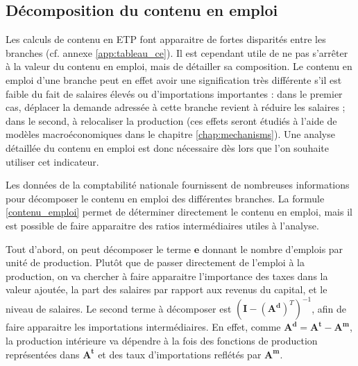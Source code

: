 \subsection{Décomposition du contenu en emploi}

Les calculs de contenu en ETP font apparaitre de fortes disparités entre les branches (cf. annexe \ref{app:tableau_ce}). Il est cependant utile de ne pas s’arrêter à la valeur du contenu en emploi, mais de détailler sa composition. Le contenu en emploi d’une branche peut en effet avoir une signification très différente s’il est faible du fait de salaires élevés ou d’importations importantes : dans le premier cas, déplacer la demande adressée à cette branche revient à réduire les salaires ; dans le second, à relocaliser la production (ces effets seront étudiés à l'aide de modèles macroéconomiques dans le chapitre \ref{chap:mechanisms}).  Une analyse détaillée du contenu en emploi est donc nécessaire dès lors que l’on souhaite utiliser cet indicateur.

Les données de la comptabilité nationale fournissent de nombreuses informations pour décomposer le contenu en emploi des différentes branches. La formule \ref{contenu_emploi} permet de déterminer directement le contenu en emploi, mais il est possible de faire apparaitre des ratios intermédiaires utiles à l'analyse.

Tout d'abord, on peut décomposer le terme $\pmb{e}$ donnant le nombre d'emplois par unité de production. Plutôt que de passer directement de l'emploi à la production, on va chercher à faire apparaitre l'importance des taxes dans la valeur ajoutée, la part des salaires par rapport aux revenus du capital, et le niveau de salaires.
Le second terme à décomposer est $(\pmb{I} - (\pmb{A^d})^T)^{-1}$, afin de faire apparaitre les importations intermédiaires. En effet, comme $\pmb{A^d} = \pmb{A^t} - \pmb{A^m}$, la production intérieure va dépendre à la fois des fonctions de production représentées dans $\pmb{A^t}$ et des taux d'importations reflétés par $\pmb{A^m}$.

